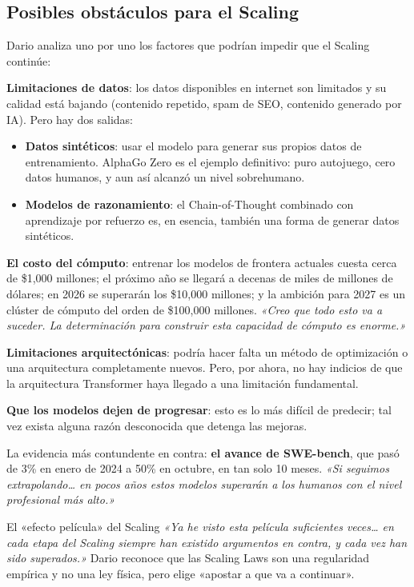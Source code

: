 \documentclass[a4paper]{article}
\begin{document}
\subsection{Posibles obstáculos para el Scaling}

Dario analiza uno por uno los factores que podrían impedir que el Scaling continúe:

\textbf{Limitaciones de datos}: los datos disponibles en internet son limitados y su calidad está bajando (contenido repetido, spam de SEO, contenido generado por IA). Pero hay dos salidas:
\begin{itemize}
    \item \textbf{Datos sintéticos}: usar el modelo para generar sus propios datos de entrenamiento. AlphaGo Zero es el ejemplo definitivo: puro autojuego, cero datos humanos, y aun así alcanzó un nivel sobrehumano.
    \item \textbf{Modelos de razonamiento}: el Chain-of-Thought combinado con aprendizaje por refuerzo es, en esencia, también una forma de generar datos sintéticos.
\end{itemize}

\textbf{El costo del cómputo}: entrenar los modelos de frontera actuales cuesta cerca de \$1,000 millones; el próximo año se llegará a decenas de miles de millones de dólares; en 2026 se superarán los \$10,000 millones; y la ambición para 2027 es un clúster de cómputo del orden de \$100,000 millones. \textit{«Creo que todo esto va a suceder. La determinación para construir esta capacidad de cómputo es enorme.»}

\textbf{Limitaciones arquitectónicas}: podría hacer falta un método de optimización o una arquitectura completamente nuevos. Pero, por ahora, no hay indicios de que la arquitectura Transformer haya llegado a una limitación fundamental.

\textbf{Que los modelos dejen de progresar}: esto es lo más difícil de predecir; tal vez exista alguna razón desconocida que detenga las mejoras.

La evidencia más contundente en contra: \textbf{el avance de SWE-bench}, que pasó de 3\% en enero de 2024 a 50\% en octubre, en tan solo 10 meses. \textit{«Si seguimos extrapolando… en pocos años estos modelos superarán a los humanos con el nivel profesional más alto.»}

\begin{importantbox}{El «efecto película» del Scaling}
\textit{«Ya he visto esta película suficientes veces… en cada etapa del Scaling siempre han existido argumentos en contra, y cada vez han sido superados.»} Dario reconoce que las Scaling Laws son una regularidad empírica y no una ley física, pero elige «apostar a que va a continuar».
\end{importantbox}
\end{document}
